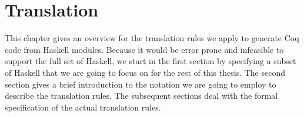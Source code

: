 \chapter{Translation} \label{chp:translation}

This chapter gives an overview for the translation rules we apply to generate Coq code from Haskell modules.
Because it would be error prone and infeasible to support the full set of Haskell, we start in the first section by specifying a subset of Haskell that we are going to focus on for the rest of this thesis.
The second section gives a brief introduction to the notation we are going to employ to describe the translation rules.
The subsequent sections deal with the formal specification of the actual translation rules.







